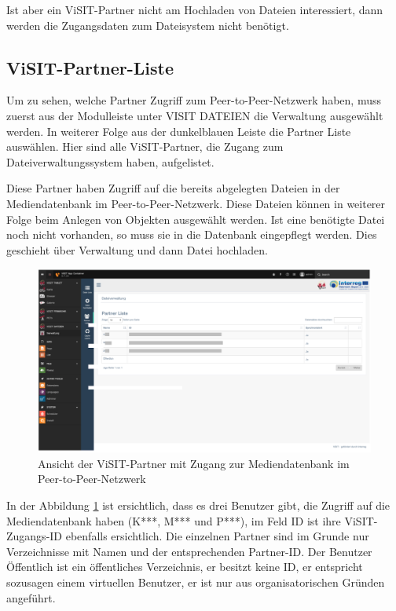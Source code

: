 Ist aber ein ViSIT-Partner nicht am Hochladen von Dateien interessiert, dann werden die Zugangsdaten zum Dateisystem nicht benötigt.

\subsection{ViSIT-Partner-Liste}

Um zu sehen, welche Partner Zugriff zum Peer-to-Peer-Netzwerk haben, muss zuerst aus der Modulleiste unter VISIT DATEIEN die \glqq Verwaltung\grqq{} ausgewählt werden. In weiterer Folge  aus der dunkelblauen Leiste die \glqq Partner Liste\grqq{} auswählen. Hier sind alle ViSIT-Partner, die Zugang zum Dateiverwaltungssystem haben, aufgelistet.

Diese Partner haben Zugriff auf die bereits abgelegten Dateien in der Mediendatenbank im Peer-to-Peer-Netzwerk. Diese Dateien können in weiterer Folge beim Anlegen von Objekten ausgewählt werden. Ist eine benötigte Datei noch nicht vorhanden, so muss sie in die Datenbank eingepflegt werden. Dies geschieht über Verwaltung und dann Datei hochladen.\\

\begin{figure}[ht!]
\centering
\includegraphics[width=12cm]{Figures/paula/dateiverwaltung/visit_partner.png}
\caption{Ansicht der ViSIT-Partner mit Zugang zur Mediendatenbank im Peer-to-Peer-Netzwerk}
\label{img:visit_partner}
\end{figure}

In der Abbildung \ref{img:visit_partner} ist ersichtlich, dass es drei Benutzer gibt, die Zugriff auf die Mediendatenbank haben (K***, M*** und P***), im Feld ID ist ihre ViSIT-Zugangs-ID ebenfalls ersichtlich. Die einzelnen Partner sind im Grunde nur Verzeichnisse mit Namen und der entsprechenden Partner-ID. Der Benutzer Öffentlich ist ein öffentliches Verzeichnis, er besitzt keine ID, er entspricht sozusagen einem virtuellen Benutzer, er ist nur aus organisatorischen Gründen angeführt.

